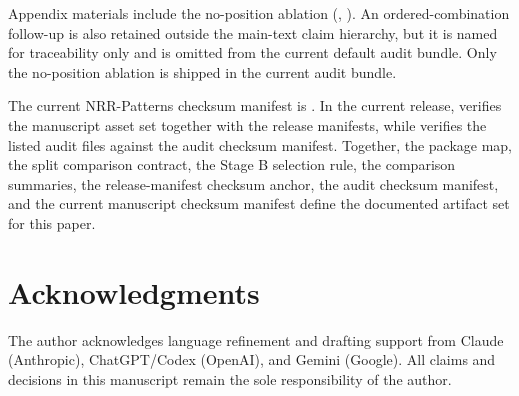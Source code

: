 \documentclass[11pt,a4paper]{article}
\begin{document}
Appendix materials include the no-position ablation
(, ).
An ordered-combination follow-up is also retained outside the main-text claim
hierarchy, but it is named for traceability only and is omitted from the
current default audit bundle. Only the no-position ablation is shipped in the
current audit bundle.

The current NRR-Patterns checksum manifest is
. In the current
release,  verifies the manuscript asset
set together with the release manifests, while
 verifies the listed audit files
against the audit checksum manifest. Together, the package map, the split
comparison contract, the Stage B selection rule, the comparison summaries, the
release-manifest checksum anchor, the audit checksum manifest, and the current
manuscript checksum manifest define the documented artifact set for this paper.

\section*{Acknowledgments}
The author acknowledges language refinement and drafting support from Claude
(Anthropic), ChatGPT/Codex (OpenAI), and Gemini (Google). All claims and
decisions in this manuscript remain the sole responsibility of the author.
\end{document}
